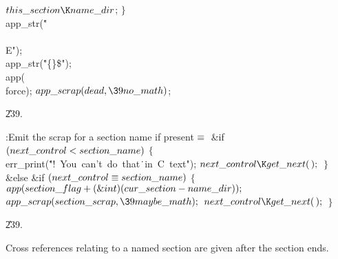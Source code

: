 ${}\\{this\_section}\K\\{name\_dir}{}$;\6
\4${}\}{}$\2\6
\\{app\_str}(\.{"\\\\E"});\6
\\{app\_str}(\.{"\{\}\$"});\6
\\{app}(\\{force});\6
${}\\{app\_scrap}(\\{dead},\39\\{no\_math}){}$;\par
\U239.\fi

\B{}:Emit the scrap for a section name if present\X${}\equiv{}$\6
\&{if} ${}(\\{next\_control}<\\{section\_name}){}$\5
${}\{{}$\1\6
\\{err\_print}(\.{"!\ You\ can't\ do\ that}\)\.{\ in\ C\ text"});\6
${}\\{next\_control}\K\\{get\_next}(\,);{}$\6
\4${}\}{}$\2\6
\&{else} \&{if} ${}(\\{next\_control}\equiv\\{section\_name}){}$\5
${}\{{}$\1\6
${}\\{app}(\\{section\_flag}+(\&{int})(\\{cur\_section}-\\{name\_dir}));{}$\6
${}\\{app\_scrap}(\\{section\_scrap},\39\\{maybe\_math});{}$\6
${}\\{next\_control}\K\\{get\_next}(\,);{}$\6
\4${}\}{}$\2\par
\U239.\fi

Cross references relating to a named section are given
after the section ends.

